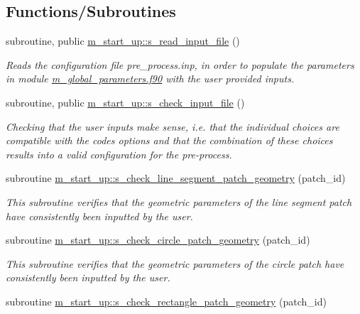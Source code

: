 \subsection*{Functions/\+Subroutines}
\begin{DoxyCompactItemize}
\item 
subroutine, public \hyperlink{namespacem__start__up_ae0571e78c0179c22d3811df31c33c321}{m\+\_\+start\+\_\+up\+::s\+\_\+read\+\_\+input\+\_\+file} ()
\begin{DoxyCompactList}\small\item\em Reads the configuration file pre\+\_\+process.\+inp, in order to populate the parameters in module \hyperlink{m__global__parameters_8f90}{m\+\_\+global\+\_\+parameters.\+f90} with the user provided inputs. \end{DoxyCompactList}\item 
subroutine, public \hyperlink{namespacem__start__up_ab5f7e03f1da1999ee699cec4f26370e0}{m\+\_\+start\+\_\+up\+::s\+\_\+check\+\_\+input\+\_\+file} ()
\begin{DoxyCompactList}\small\item\em Checking that the user inputs make sense, i.\+e. that the individual choices are compatible with the code\textquotesingle{}s options and that the combination of these choices results into a valid configuration for the pre-\/process. \end{DoxyCompactList}\item 
subroutine \hyperlink{namespacem__start__up_a9a3e975da11ddbbabdf66a66ff9167d1}{m\+\_\+start\+\_\+up\+::s\+\_\+check\+\_\+line\+\_\+segment\+\_\+patch\+\_\+geometry} (patch\+\_\+id)
\begin{DoxyCompactList}\small\item\em This subroutine verifies that the geometric parameters of the line segment patch have consistently been inputted by the user. \end{DoxyCompactList}\item 
subroutine \hyperlink{namespacem__start__up_a2ab9d448e20b9f9b5db3adbb28e011fe}{m\+\_\+start\+\_\+up\+::s\+\_\+check\+\_\+circle\+\_\+patch\+\_\+geometry} (patch\+\_\+id)
\begin{DoxyCompactList}\small\item\em This subroutine verifies that the geometric parameters of the circle patch have consistently been inputted by the user. \end{DoxyCompactList}\item 
subroutine \hyperlink{namespacem__start__up_a038565f6f0f4ed12a0a3738ab880f507}{m\+\_\+start\+\_\+up\+::s\+\_\+check\+\_\+rectangle\+\_\+patch\+\_\+geometry} (patch\+\_\+id)

\end{DoxyCompactItemize}
